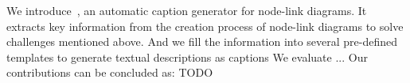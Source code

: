 We introduce~\textit{\ApproachName}, an automatic caption generator for node-link diagrams.
It extracts key information from the creation process of node-link diagrams to solve challenges mentioned above.
And we fill the information into several pre-defined templates to generate textual descriptions as captions
{\color{red} We evaluate ...}
Our contributions can be concluded as:
{\colorbox{text-highlight}TODO}

